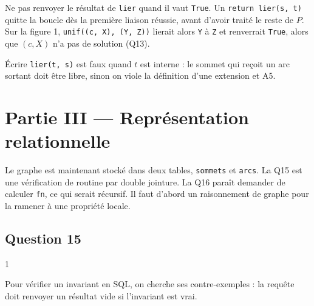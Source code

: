 \documentclass[11pt,a4paper]{article}
\begin{document}
\begin{piege}

Ne pas renvoyer le résultat de \texttt{lier} quand il vaut \texttt{True}. Un \texttt{return\ lier(\allowbreak{}s,\allowbreak{}\ t)\allowbreak{}} quitte la boucle dès la première liaison réussie, avant d'avoir traité le reste de \(P\). Sur la figure 1, \texttt{unif(\allowbreak{}{[}(\allowbreak{}\textquotesingle{}c\textquotesingle{},\allowbreak{}\ \textquotesingle{}X\textquotesingle{})\allowbreak{},\allowbreak{}\ (\allowbreak{}\textquotesingle{}Y\textquotesingle{},\allowbreak{}\ \textquotesingle{}Z\textquotesingle{})\allowbreak{}{]}\allowbreak{})\allowbreak{}} lierait alors \texttt{Y} à \texttt{Z} et renverrait \texttt{True}, alors que \((c,X)\) n'a pas de solution (Q13).

\end{piege}

\begin{piege}

Écrire \texttt{lier(t,\ s)} est faux quand \(t\) est interne : le sommet qui reçoit un arc sortant doit être libre, sinon on viole la définition d'une extension et A5.

\end{piege}

\hypertarget{partie-iii-repruxe9sentation-relationnelle}{%
\section{Partie III --- Représentation relationnelle}\label{partie-iii-repruxe9sentation-relationnelle}}

Le graphe est maintenant stocké dans deux tables, \texttt{sommets} et \texttt{arcs}. La Q15 est une vérification de routine par double jointure. La Q16 paraît demander de calculer \texttt{fn}, ce qui serait récursif. Il faut d'abord un raisonnement de graphe pour la ramener à une propriété locale.

\hypertarget{question-15}{%
\subsection{Question 15}\label{question-15}}

\begin{indication}{1}

Pour vérifier un invariant en SQL, on cherche ses contre-exemples : la requête doit renvoyer un résultat vide si l'invariant est vrai.

\end{indication}
\end{document}
